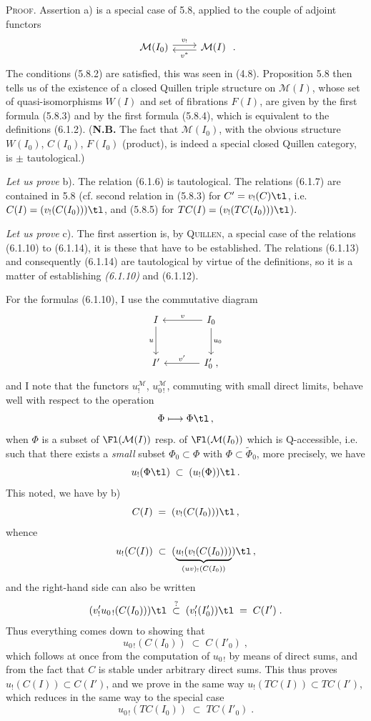 \textsc{Proof}. Assertion a) is a special case of 5.8, applied to the couple of adjoint functors
\[
\begin{tikzcd}
\mathcal{M}(I_0) \arrow[r, shift left, "v_!"] & \mathcal{M}(I) \arrow[l, shift left, "v^{*}"]
\end{tikzcd}
\;.
\]
The conditions (5.8.2) are satisfied, this was seen in (4.8). Proposition 5.8 then tells us of the existence of a closed Quillen triple structure on $\mathcal{M}(I)$, whose set of quasi-isomorphisms $W(I)$ and set of fibrations $F(I)$, are given by the first formula (5.8.3) and by the first formula (5.8.4), which is equivalent to the definitions (6.1.2). (\textbf{N.B.} The fact that $\mathcal{M}(I_0)$, with the obvious structure $W(I_0)$, $C(I_0)$, $F(I_0)$ (product), is
indeed a special closed Quillen category, is $\pm$ tautological.)

\textit{Let us prove} b). The relation (6.1.6) is tautological. The relations (6.1.7) are contained in 5.8 (cf. second relation in (5.8.3) for $C' = v_!(C)\tl$, i.e. $C(I) = (v_!(C(I_0)))\tl$, and (5.8.5) for $TC(I) = (v_!(TC(I_0)))\tl$).

\textit{Let us prove} c). The first assertion is, by \textsc{Quillen}, a special case of the relations (6.1.10) to (6.1.14), it is these that have to be established. The relations (6.1.13) and consequently (6.1.14) are tautological by virtue of the definitions, so it is a matter of establishing \textit{(6.1.10)} and (6.1.12).

For the formulas (6.1.10), I use the commutative diagram
\[
\begin{tikzcd}[row sep=large, column sep=large]
I \arrow[d, "u"'] & I_0 \arrow[l, "v"'] \arrow[d, "u_0"] \\
I' & I'_0\;, \arrow[l, "v'"']
\end{tikzcd}
\]
and I note that the functors $u_!^{\mathcal{M}}$, $u_{0\,!}^{\mathcal{M}}$, commuting with small direct limits,
behave well with respect to the operation
\[
\Phi \longmapsto \Phi\tl\,,
\]
when $\Phi$ is a subset of $\Fl(\mathcal{M}(I))$ resp. of $\Fl(\mathcal{M}(I_0))$ which is Q-accessible, i.e. such that there exists a \textit{small} subset $\Phi_0 \subset \Phi$ with $\Phi \subset \tilde{\Phi}_0$, more precisely, we have
\[
u_!(\Phi\tl) \;\subset\; (u_!(\Phi))\tl\,.
\]
This noted, we have by b)
\[
C(I) \;=\; (v_!(C(I_0)))\tl\,,
\]
whence
\[
u_!(C(I)) \;\subset\; (\underbrace{u_!(v_!(C(I_0)))}_{(uv)_!(C(I_0))})\tl\,,
\]
and the right-hand side can also be written
\[
(v'_!u_{0\,!}(C(I_0)))\tl \;\overset{?}{\subset}\; (v'_!(I'_0))\tl \;=\; C(I')\;. %
\]
Thus everything comes down to showing that
\[
u_{0\,!}(C(I_0)) \;\subset\; C(I'_0)\;,
\tag*{(6.1.16)}
\]
which follows at once from the computation of $u_{0\,!}$ by means of direct sums, and from the fact that $C$ is stable under arbitrary direct sums. This thus proves $u_!(C(I)) \subset C(I')$, and we prove in the same way $u_!(TC(I)) \subset TC(I')$, which reduces in the same way to the special case
\[
u_{0\,!}(TC(I_0)) \;\subset\; TC(I'_0)\;.
\tag*{(6.1.17)}
\]

